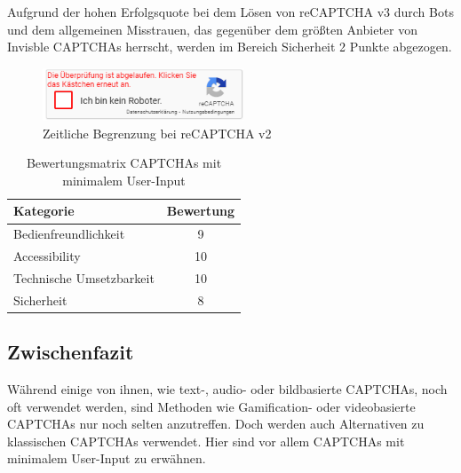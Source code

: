 Aufgrund der hohen Erfolgsquote bei dem Lösen von reCAPTCHA v3 durch Bots 
und dem allgemeinen Misstrauen, das gegenüber dem größten Anbieter von Invisble CAPTCHAs herrscht, 
werden im Bereich Sicherheit 2 Punkte abgezogen.

\begin{figure}[h!]
    \centering\includegraphics[width=6cm]{gfx/mygraphics/recaptchaabgelaufen.png}
     \caption{Zeitliche Begrenzung bei reCAPTCHA v2}
      \label{fig:recaptchaabgelaufen}
\end{figure}

\begin{table}[h!]
    \caption{Bewertungsmatrix CAPTCHAs mit minimalem User-Input}
    \begin{center}
        \begin{tabular}{l|c}
            Kategorie                       & Bewertung \\\hline
            Bedienfreundlichkeit            & 9         \\
            Accessibility                   & 10        \\
            Technische Umsetzbarkeit        & 10         \\
            Sicherheit                      & 8         
        \end{tabular}
    \end{center}
\end{table}

\subsection*{Zwischenfazit}
Während einige von ihnen, wie text-, audio- oder bildbasierte CAPTCHAs, noch oft verwendet werden, 
sind Methoden wie Gamification- oder videobasierte CAPTCHAs nur noch selten anzutreffen.
Doch werden auch Alternativen zu klassischen CAPTCHAs verwendet. Hier sind vor allem CAPTCHAs mit minimalem User-Input zu erwähnen. 